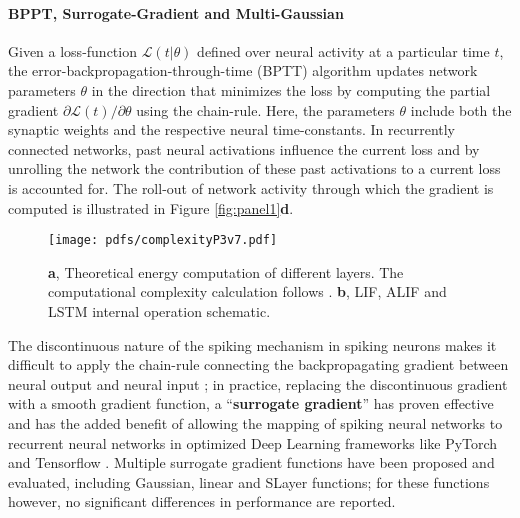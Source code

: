 \documentclass[fleqn,10pt]{wlscirep}
\begin{document}
\paragraph{BPPT, Surrogate-Gradient and Multi-Gaussian}







Given a loss-function $\mathcal{L}(t | { \theta})$ defined over neural activity at a particular time $t$, the error-backpropagation-through-time (BPTT) algorithm \cite{werbos1990backpropagation} updates network parameters ${\theta}$ in the direction that minimizes the loss by computing the partial gradient $\partial \mathcal{L}(t)/ \partial { \theta}$ using the chain-rule. Here, the parameters ${ \theta}$ include both the synaptic weights and the respective neural time-constants. In recurrently connected networks, past neural activations influence the current loss and by unrolling the network the contribution of these past activations to a current loss is accounted for. The roll-out of network activity through which the gradient is computed is illustrated in Figure \ref{fig:panel1}\textbf{d}. 

\begin{figure}[ht!]
\centering
\texttt{[image: pdfs/complexityP3v7.pdf]}
\caption{\textbf{a}, Theoretical energy computation of different layers. The computational complexity calculation follows \cite{hunger2005floating}. \textbf{b}, LIF, ALIF and LSTM internal operation schematic.}
\label{fig:compcost}
\end{figure}

The discontinuous nature of the spiking mechanism in spiking neurons makes it difficult to apply the chain-rule connecting the backpropagating gradient between neural output and neural input \cite{bohte2000spikeprop}; in practice, replacing the discontinuous gradient with a smooth gradient function, a ``{\bf surrogate gradient}'' has proven effective  \cite{bohte2011error,neftci2019surrogate,bellec2020solution} and has the added benefit of allowing the mapping of spiking neural networks to recurrent neural networks in optimized Deep Learning frameworks like PyTorch and Tensorflow \cite{neftci2019surrogate}. Multiple surrogate gradient functions have been proposed and evaluated, including Gaussian, linear\cite{bellec2018long} and SLayer \cite{shrestha2018slayer} functions; for these functions however, no significant differences in performance are reported\cite{neftci2019surrogate}. 
\end{document}
